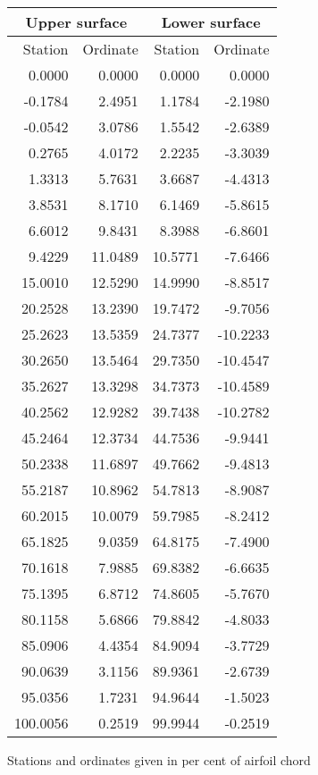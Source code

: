 \documentclass[11pt]{book}
\begin{document}
 \hspace{4mm}
 \begin{tabular}{|r|r|r|r|} \hline 
 \multicolumn{2}{|c|}{Upper surface} & \multicolumn{2}{|c|}{Lower surface} \\
 \hline
 Station & Ordinate & Station & Ordinate \\
 \hline
0.0000 & 0.0000 & 0.0000 & 0.0000 \\
-0.1784 & 2.4951 & 1.1784 & -2.1980 \\
-0.0542 & 3.0786 & 1.5542 & -2.6389 \\
0.2765 & 4.0172 & 2.2235 & -3.3039 \\
1.3313 & 5.7631 & 3.6687 & -4.4313 \\
3.8531 & 8.1710 & 6.1469 & -5.8615 \\
6.6012 & 9.8431 & 8.3988 & -6.8601 \\
9.4229 & 11.0489 & 10.5771 & -7.6466 \\
15.0010 & 12.5290 & 14.9990 & -8.8517 \\
20.2528 & 13.2390 & 19.7472 & -9.7056 \\
25.2623 & 13.5359 & 24.7377 & -10.2233 \\
30.2650 & 13.5464 & 29.7350 & -10.4547 \\
35.2627 & 13.3298 & 34.7373 & -10.4589 \\
40.2562 & 12.9282 & 39.7438 & -10.2782 \\
45.2464 & 12.3734 & 44.7536 & -9.9441 \\
50.2338 & 11.6897 & 49.7662 & -9.4813 \\
55.2187 & 10.8962 & 54.7813 & -8.9087 \\
60.2015 & 10.0079 & 59.7985 & -8.2412 \\
65.1825 & 9.0359 & 64.8175 & -7.4900 \\
70.1618 & 7.9885 & 69.8382 & -6.6635 \\
75.1395 & 6.8712 & 74.8605 & -5.7670 \\
80.1158 & 5.6866 & 79.8842 & -4.8033 \\
85.0906 & 4.4354 & 84.9094 & -3.7729 \\
90.0639 & 3.1156 & 89.9361 & -2.6739 \\
95.0356 & 1.7231 & 94.9644 & -1.5023 \\
100.0056 & 0.2519 & 99.9944 & -0.2519 \\
 \hline 
 \end{tabular}
 \vspace{8mm}

Stations and ordinates given in per cent of airfoil chord
\end{document}
